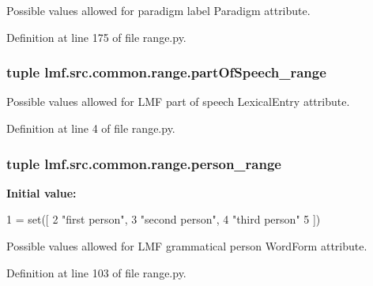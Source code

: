 Possible values allowed for paradigm label Paradigm attribute. 



Definition at line 175 of file range.\+py.

\hypertarget{namespacelmf_1_1src_1_1common_1_1range_a06c6dcbacac56dba9aaf04fa02b528e1}{
\subsubsection[{part\+Of\+Speech\+\_\+range}]{\setlength{\rightskip}{0pt plus 5cm}tuple lmf.\+src.\+common.\+range.\+part\+Of\+Speech\+\_\+range}}\label{namespacelmf_1_1src_1_1common_1_1range_a06c6dcbacac56dba9aaf04fa02b528e1}


Possible values allowed for L\+M\+F part of speech Lexical\+Entry attribute. 



Definition at line 4 of file range.\+py.

\hypertarget{namespacelmf_1_1src_1_1common_1_1range_ad711c6c7c0e62384f61b106ec7bf2af0}{
\subsubsection[{person\+\_\+range}]{\setlength{\rightskip}{0pt plus 5cm}tuple lmf.\+src.\+common.\+range.\+person\+\_\+range}}\label{namespacelmf_1_1src_1_1common_1_1range_ad711c6c7c0e62384f61b106ec7bf2af0}
{\bfseries Initial value\+:}
\begin{DoxyCode}
1 = set([
2     \textcolor{stringliteral}{"first person"},
3     \textcolor{stringliteral}{"second person"},
4     \textcolor{stringliteral}{"third person"}
5 ])
\end{DoxyCode}


Possible values allowed for L\+M\+F grammatical person Word\+Form attribute. 



Definition at line 103 of file range.\+py.

